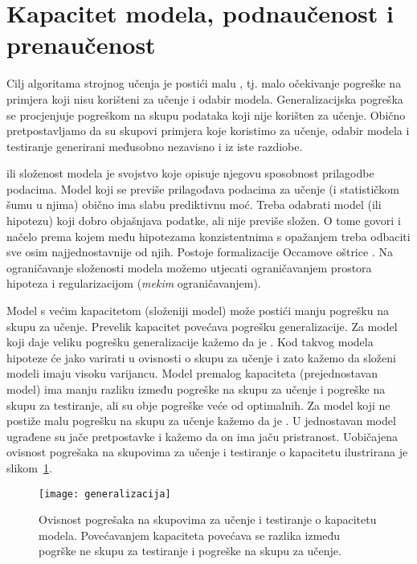 \documentclass[utf8, diplomski, lmodern]{fer}
\begin{document}
\section{Kapacitet modela, podnaučenost i prenaučenost}

Cilj algoritama strojnog učenja je postići malu , tj. malo očekivanje pogreške na primjera koji nisu korišteni za učenje i odabir modela. Generalizacijska pogreška se procjenjuje pogreškom na skupu podataka koji nije korišten za učenje. Obično pretpostavljamo da su skupovi primjera koje koristimo za učenje, odabir modela i testiranje generirani međusobno nezavisno i iz iste razdiobe.

 ili složenost modela je svojstvo koje opisuje njegovu sposobnost prilagodbe podacima. Model koji se previše prilagođava podacima za učenje (i statističkom šumu u njima) obično ima slabu prediktivnu moć. Treba odabrati model (ili hipotezu) koji dobro objašnjava podatke, ali nije previše složen. O tome govori i načelo  prema kojem među hipotezama konzistentnima s opažanjem treba odbaciti sve osim najjednostavnije od njih. Postoje formalizacije Occamove oštrice \citep{Blumer:1987:OR,Blumer:1989:LVCD,Gruenwald:2005:TIMDL,Ratmanner:2011:PTUI}. Na ograničavanje složenosti modela možemo utjecati ograničavanjem prostora hipoteza i regularizacijom (\textit{mekim} ograničavanjem).

Model s većim kapacitetom (složeniji model) može postići manju pogrešku na skupu za učenje. Prevelik kapacitet povećava pogrešku generalizacije. Za model koji daje veliku pogrešku generalizacije kažemo da je . Kod takvog modela hipoteze će jako varirati u ovisnosti o skupu za učenje i zato kažemo da složeni modeli imaju visoku varijancu. Model premalog kapaciteta (prejednostavan model) ima manju razliku između pogreške na skupu za učenje i pogreške na skupu za testiranje, ali su obje pogreške veće od optimalnih. Za model koji ne postiže malu pogrešku na skupu za učenje kažemo da je . U jednostavan model ugrađene su jače pretpostavke i kažemo da on ima jaču pristranost. Uobičajena ovisnost pogrešaka na skupovima za učenje i testiranje o kapacitetu ilustrirana je slikom~\ref{fig:generalizacija}.

\begin{figure}
	\centering
	\texttt{[image: generalizacija]}
	\caption{Ovisnost pogrešaka na skupovima za učenje i testiranje o kapacitetu modela. Povećavanjem kapaciteta povećava se razlika između pogrške ne skupu za testiranje i pogreške na skupu za učenje.}
	\label{fig:generalizacija}
\end{figure}
\end{document}
